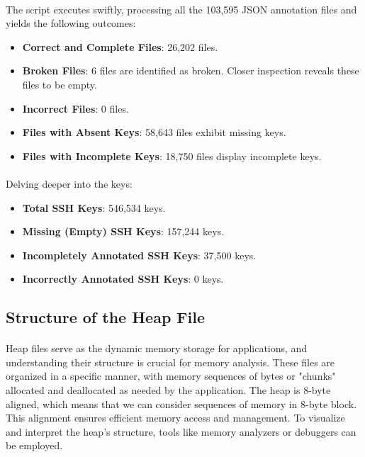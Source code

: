             \paragraph{}The script executes swiftly, processing all the 103,595 JSON annotation files and yields the following outcomes:

            \begin{itemize}
                \item \textbf{Correct and Complete Files}: 26,202 files.
                \item \textbf{Broken Files}: 6 files are identified as broken. Closer inspection reveals these files to be empty.
                \item \textbf{Incorrect Files}: 0 files.
                \item \textbf{Files with Absent Keys}: 58,643 files exhibit missing keys.
                \item \textbf{Files with Incomplete Keys}: 18,750 files display incomplete keys.
            \end{itemize}

            \paragraph{}Delving deeper into the keys:

            \begin{itemize}
                \item \textbf{Total SSH Keys}: 546,534 keys.
                \item \textbf{Missing (Empty) SSH Keys}: 157,244 keys.
                \item \textbf{Incompletely Annotated SSH Keys}: 37,500 keys.
                \item \textbf{Incorrectly Annotated SSH Keys}: 0 keys.
            \end{itemize}

    \subsection{Structure of the Heap File}
        \paragraph{}Heap files serve as the dynamic memory storage for applications, and understanding their structure is crucial for memory analysis. These files are organized in a specific manner, with memory sequences of bytes or "chunks" allocated and deallocated as needed by the application. The heap is 8-byte aligned, which means that we can consider sequences of memory in 8-byte \gls{block}. This alignment ensures efficient memory access and management. To visualize and interpret the heap's structure, tools like memory analyzers or debuggers can be employed.

